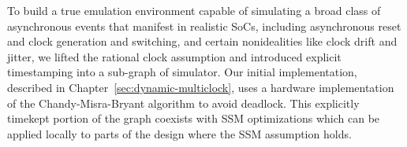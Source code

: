 To build a true emulation environment capable of simulating a broad class of
asynchronous events that manifest in realistic SoCs, including asynchronous
reset and clock generation and switching, and certain nonidealities like clock
drift and jitter, we lifted the rational clock assumption and introduced explicit
timestamping into a sub-graph of simulator. Our initial implementation,
described in Chapter~\ref{sec:dynamic-multiclock}, uses a hardware
implementation of the Chandy-Misra-Bryant algorithm to avoid
deadlock. This explicitly timekept portion of the graph coexists with SSM
optimizations which can be applied locally to parts of the design where the SSM
assumption holds.

